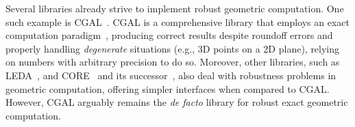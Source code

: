 Several libraries already strive to implement robust geometric computation.  One
such example is \acf{CGAL}~\cite{CGAL:2018}.  \Ac{CGAL} is a comprehensive
library that employs an exact computation paradigm~\cite{Yap:1995:ECP},
producing correct results despite roundoff errors and properly handling
\textit{degenerate} situations (e.g., 3D points on a 2D plane), relying on
numbers with arbitrary precision to do so.  Moreover, other libraries, such as
\acs{LEDA}\label{acro:LEDA}~\cite{LEDA:2017,Mehlhorn:1989:LEDA}, and
CORE~\cite{Karamcheti:1999:CLRNGC} and its successor~\cite{Yu:2010:CORE2}, also
deal with robustness problems in geometric computation, offering simpler
interfaces when compared to \ac{CGAL}.  However, \ac{CGAL} arguably remains the
\textit{de facto} library for robust exact geometric computation.

